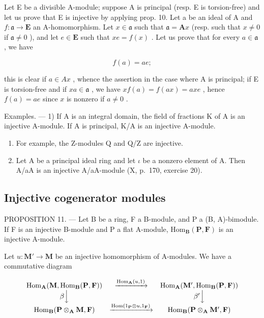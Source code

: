 Let E be a divisible A-module; suppose A is principal (resp. E is torsion-free) and let us prove that E is injective by applying prop. 10. Let a be an ideal of A and \(f: \mathfrak{a} \to \mathbf{E}\) an A-homomorphism. Let \(x \in \mathfrak{a}\) such that \(\mathfrak{a} = \mathbf{A}x\) (resp. such that \(x \neq 0\) if \(\mathfrak{a} \neq 0\) ), and let \(e \in \mathbf{E}\) such that \(xe = f(x)\) . Let us prove that for every \(a \in \mathfrak{a}\) , we have

\[
f (a) = a e;
\]

this is clear if \(a \in Ax\) , whence the assertion in the case where A is principal; if E is torsion-free and if \(xa \in \mathfrak{a}\) , we have \(xf(a) = f(ax) = axe\) , hence \(f(a) = ae\) since \(x\) is nonzero if \(a \neq 0\) .

Examples. --- 1) If A is an integral domain, the field of fractions K of A is an injective A-module. If A is principal, K/A is an injective A-module.

\begin{enumerate}
\def\labelenumi{\arabic{enumi})}
\setcounter{enumi}{1}
\item
  For example, the Z-modules Q and Q/Z are injective.
\item
  Let A be a principal ideal ring and let \(\iota\) be a nonzero element of A. Then A/aA is an injective A/aA-module (X, p.~170, exercise 20).
\end{enumerate}

\subsection{Injective cogenerator modules}

PROPOSITION 11. --- Let B be a ring, F a B-module, and P a (B, A)-bimodule. If F is an injective B-module and P a flat A-module, \(\mathrm{Hom}_{\mathbf{B}}(\mathbf{P},\mathbf{F})\) is an injective A-module.

Let \(u: \mathbf{M}' \to \mathbf{M}\) be an injective homomorphism of A-modules. We have a commutative diagram

\[
\begin{array}{c c c} \operatorname{Hom} _ {\mathbf {A}} (\mathbf {M}, \operatorname{Hom} _ {\mathbf {B}} (\mathbf {P}, \mathbf {F})) & \xrightarrow {\operatorname{Hom} _ {\mathbf {A}} (u , 1)} & \operatorname{Hom} _ {\mathbf {A}} (\mathbf {M} ^ {\prime}, \operatorname{Hom} _ {\mathbf {B}} (\mathbf {P}, \mathbf {F})) \\ \beta \Big \downarrow & & \beta^ {\prime} \Big \downarrow \\ \operatorname{Hom} _ {\mathbf {B}} (\mathbf {P} \otimes_ {\mathbf {A}} \mathbf {M}, \mathbf {F}) & \xrightarrow {\operatorname{Hom} (1 _ {\mathbf {P}} \otimes u , 1 _ {\mathbf {F}})} & \operatorname{Hom} _ {\mathbf {B}} (\mathbf {P} \otimes_ {\mathbf {A}} \mathbf {M} ^ {\prime}, \mathbf {F}) \end{array}
\]

